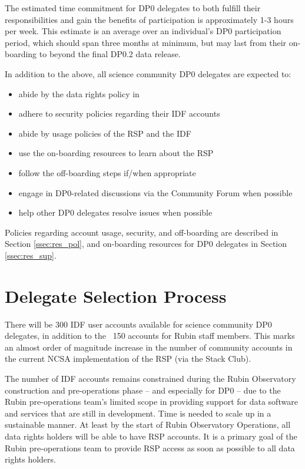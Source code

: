 \documentclass[DM,lsstdraft,authoryear,toc]{lsstdoc}
\begin{document}
The estimated time commitment for DP0 delegates to both fulfill their responsibilities and gain the benefits of participation is approximately 1-3 hours per week.
This estimate is an average over an individual's DP0 participation period, which should span three months at minimum, but may last from their on-boarding to beyond the final DP0.2 data release.

In addition to the above, all science community DP0 delegates are expected to:
\begin{itemize}
\item abide by the data rights policy in 
\item adhere to security policies regarding their IDF accounts
\item abide by usage policies of the RSP and the IDF
\item use the on-boarding resources to learn about the RSP
\item follow the off-boarding steps if/when appropriate
\item engage in DP0-related discussions via the Community Forum when possible
\item help other DP0 delegates resolve issues when possible
\end{itemize}

Policies regarding account usage, security, and off-boarding are described in Section \ref{ssec:res_pol}, and on-boarding resources for DP0 delegates in Section \ref{ssec:res_sup}. 


\section{Delegate Selection Process}\label{sec:sel}

There will be 300 IDF user accounts available for science community DP0 delegates, in addition to the ~150 accounts for Rubin staff members.
This marks an almost order of magnitude increase in the number of community accounts in the current NCSA implementation of the RSP (via the Stack Club).

The number of IDF accounts remains constrained during the Rubin Observatory construction and pre-operations phase -- and especially for DP0 -- due to the Rubin pre-operations team's limited scope in providing support for data software and services that are still in development.
Time is needed to scale up in a sustainable manner.
At least by the start of Rubin Observatory Operations, all data rights holders will be able to have RSP accounts.
It is a primary goal of the Rubin pre-operations team to provide RSP access as soon as possible to all data rights holders. 
\end{document}
